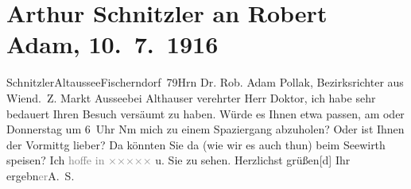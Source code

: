 

               \section[Arthur Schnitzler an Robert Adam, 10. 7. 1916]{ Arthur Schnitzler an Robert Adam, 10. 7. 1916}\nopagebreak{}\rehead{ }\begin{ledgroupsized}[t]{13cm}\normalsize\beginnumbering{} \toendnotes[C]{\smallbreak\pagebreak[2]} 
\toendnotes[C]{\smallbreak}\pstart{}{\pb}Schnitzler\pend{}\pstart{}Altaussee\pend{}\pstart{}Fischerndorf 79\pend{}{\bigskip}\pstart{}Hrn Dr. Rob. Adam Pollak, Bezirksrichter aus Wien\pend{}\pstart{}d. Z. Markt Aussee\pend{}\pstart{}bei Althauser\pend{}{\bigskip}\pstart
           \noindent{}{\pb}verehrter Herr Doktor, ich habe sehr bedauert Ihren Besuch
                    versäumt zu haben. Würde es Ihnen etwa passen, am \label{K_L02230_1v}\label{K_L02230_1h} oder Donnerstag um 6 Uhr Nm mich zu einem
                    Spaziergang abzuholen? Oder ist Ihnen der Vormittg lieber? Da könnten Sie da{\geminationn} (wie wir es auch thun) beim Seewirth speisen? Ich \textcolor{gray}{hoffe in }{ }\textcolor{gray}{×}\-\textcolor{gray}{×}\-\textcolor{gray}{×}\-\textcolor{gray}{×}\-\textcolor{gray}{×} u. Sie zu sehen. Herzlichst
                        grüßen{[}d{]} Ihr ergebn\textcolor{gray}{er}\spacefill\mbox{A. S.}\pend
                     \endnumbering{}\end{ledgroupsized}  \newcommand{\dateiname}{L02230}\newcommand{\titel}{Arthur Schnitzler an Robert Adam, 10. 7. 1916}\newcommand{\editorInnen}{Martin Anton Müller und Gerd-Hermann Susen}
            \footnotesize
\begin{ledgroupsized}[t]{11.5cm}
\end{ledgroupsized}
         
      